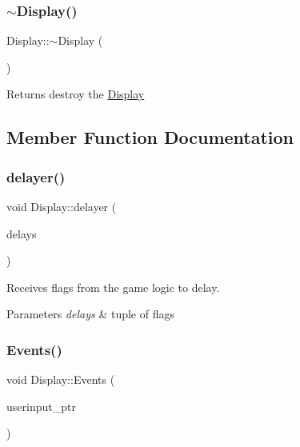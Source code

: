 \subsubsection{\texorpdfstring{$\sim$\+Display()}{~Display()}}
{\footnotesize\ttfamily Display\+::$\sim$\+Display (\begin{DoxyParamCaption}{ }\end{DoxyParamCaption})\hspace{0.3cm}{\ttfamily [inline]}}

\begin{DoxyReturn}{Returns}
destroy the \mbox{\hyperlink{class_display}{Display}} 
\end{DoxyReturn}


\subsection{Member Function Documentation}
\mbox{\label{class_display_ab1de6d8b7911336e30999b78f3f6cbe3}} 
\subsubsection{\texorpdfstring{delayer()}{delayer()}}
{\footnotesize\ttfamily void Display\+::delayer (\begin{DoxyParamCaption}\item[{tuple$<$ bool, bool, bool $>$}]{delays }\end{DoxyParamCaption})\hspace{0.3cm}{\ttfamily [inline]}}



Receives flags from the game logic to delay. 


\begin{DoxyParams}{Parameters}
{\em delays} & tuple of flags \\
\hline
\end{DoxyParams}
\mbox{\label{class_display_afd34049cad61f21d56f8d64c53282cea}} 
\subsubsection{\texorpdfstring{Events()}{Events()}}
{\footnotesize\ttfamily void Display\+::\+Events (\begin{DoxyParamCaption}\item[{shared\+\_\+ptr$<$ \mbox{\hyperlink{class_user_inputs}{User\+Inputs}} $>$}]{userinput\+\_\+ptr }\end{DoxyParamCaption})}



